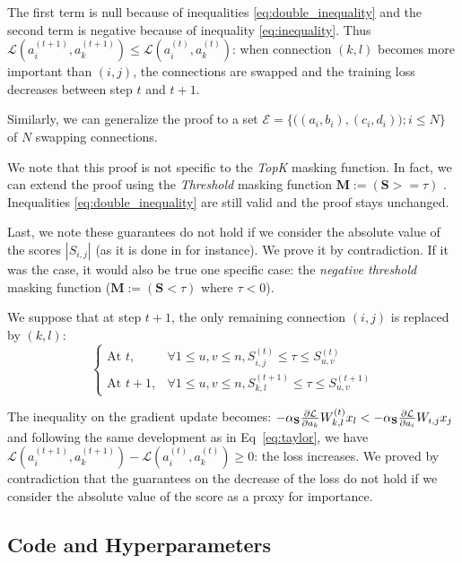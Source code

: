 \documentclass{article}
\begin{document}
The first term is null because of inequalities \eqref{eq:double_inequality} and the second term is negative because of inequality \eqref{eq:inequality}. Thus $\mathcal{L}(a^{(t+1)}_i, a^{(t+1)}_k) \leq  \mathcal{L}(a^{(t)}_i, a^{(t)}_k)$: when connection $(k,l)$ becomes more important than $(i,j)$, the connections are swapped and the training loss decreases between step $t$ and $t+1$.

Similarly, we can generalize the proof to a set $\mathcal{E} = \{\big((a_i,b_i), (c_i,d_i)\big); i \leq N\}$ of $N$ swapping connections.

We note that this proof is not specific to the \textit{TopK} masking function. In fact, we can extend the proof using the \textit{Threshold} masking function $\mathbf{M} := (\mathbf{S} >= \tau)$ \citep{Mallya2018PiggybackAM}. Inequalities \eqref{eq:double_inequality} are still valid and the proof stays unchanged. 

Last, we note these guarantees do not hold if we consider the absolute value of the scores $|S_{i,j}|$ (as it is done in \citet{Ding2019GlobalSM} for instance). We prove it by contradiction. If it was the case, it would also be true one specific case: the \textit{negative threshold} masking function ($\mathbf{M} := (\mathbf{S} < \tau)$ where $\tau < 0$).

We suppose that at step $t+1$, the only remaining connection $(i,j)$ is replaced by $(k,l)$:
\begin{equation}
\label{eq:double_inequality_contradic_proof}
    \begin{cases}
      \text{At $t$},   & \forall 1 \leq u,v \leq n, S^{(t)}_{i,j} \leq \tau \leq S^{(t)}_{u,v} \\
      \text{At $t+1$}, & \forall 1 \leq u,v \leq n, S^{(t+1)}_{k,l} \leq \tau \leq S^{(t+1)}_{u,v}
    \end{cases}
\end{equation}

The inequality on the gradient update becomes: $-\alpha_{\mathbf{S}} \frac{\partial {\cal L}}{\partial a_k} W^{(t)}_{k,l} x_l < -\alpha_{\mathbf{S}} \frac{\partial {\cal L}}{\partial a_i} W_{i,j} x_j$ and following the same development as in Eq~\eqref{eq:taylor}, we have $\mathcal{L}(a^{(t+1)}_i, a^{(t+1)}_k) - \mathcal{L}(a^{(t)}_i, a^{(t)}_k) \geq 0$: the loss increases. We proved by contradiction that the guarantees on the decrease of the loss do not hold if we consider the absolute value of the score as a proxy for importance.


\subsection{Code and Hyperparameters}
\end{document}

